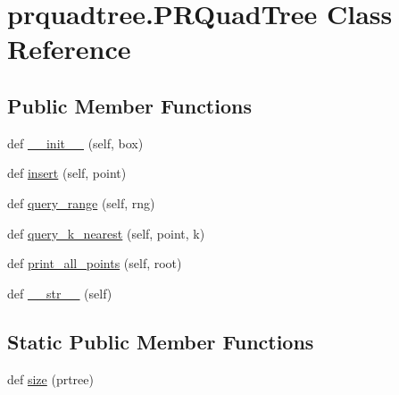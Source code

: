 \hypertarget{classprquadtree_1_1PRQuadTree}{}\section{prquadtree.\+P\+R\+Quad\+Tree Class Reference}
\label{classprquadtree_1_1PRQuadTree}
\subsection*{Public Member Functions}
\begin{DoxyCompactItemize}
\item 
def \hyperlink{classprquadtree_1_1PRQuadTree_a56de30271f808d21281b790a19448aab}{\+\_\+\+\_\+init\+\_\+\+\_\+} (self, box)
\item 
def \hyperlink{classprquadtree_1_1PRQuadTree_ab9ca8c1d94c56c72f47dabd2f90b7754}{insert} (self, point)
\item 
def \hyperlink{classprquadtree_1_1PRQuadTree_ab145cd20b246f04ddcd53ae9618b5479}{query\+\_\+range} (self, rng)
\item 
def \hyperlink{classprquadtree_1_1PRQuadTree_a578891ac618a6770184fc1c02f426b45}{query\+\_\+k\+\_\+nearest} (self, point, k)
\item 
def \hyperlink{classprquadtree_1_1PRQuadTree_a0d43d9d2ebe765b6690067c1d8bc5a8a}{print\+\_\+all\+\_\+points} (self, root)
\item 
def \hyperlink{classprquadtree_1_1PRQuadTree_a2f9dd431836575327c97cd3fb5426adb}{\+\_\+\+\_\+str\+\_\+\+\_\+} (self)
\end{DoxyCompactItemize}
\subsection*{Static Public Member Functions}
\begin{DoxyCompactItemize}
\item 
def \hyperlink{classprquadtree_1_1PRQuadTree_a5dd006b80f1697585a10722fba06e9ba}{size} (prtree)
\end{DoxyCompactItemize}
